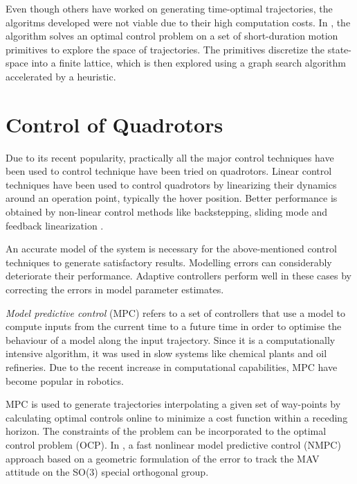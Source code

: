 Even though others have worked on generating time-optimal trajectories, the algoritms developed were not viable due to their high computation costs. In \cite{kumar2017search}, the algorithm solves an optimal control problem on a set of short-duration motion primitives to explore the space of trajectories. The primitives discretize the state-space into a finite lattice, which is then explored using a graph search algorithm accelerated by a heuristic. 

\section{Control of Quadrotors}
\label{sec:control_quadrotors}
Due to its recent popularity, practically all the major control techniques have been used to control technique have been tried on quadrotors. Linear control techniques \cite{seigwart2004pid} have been used to control quadrotors by linearizing their dynamics around an operation point, typically the hover position. Better performance is obtained by non-linear control methods like backstepping, sliding mode \cite{seigwart2005backstepping} and feedback linearization \cite{lewis2009dynamic}.

An accurate model of the system is necessary for the above-mentioned control techniques to generate satisfactory results. Modelling errors can considerably deteriorate their performance. Adaptive controllers \cite{kumar2011design} perform well in these cases by correcting the errors in model parameter estimates.

\textit{Model predictive control} (MPC) refers to a set of controllers that use a model to compute inputs from the current time to a future time in order to optimise the behaviour of a model along the input trajectory. Since it is a computationally intensive algorithm, it was used in slow systems like chemical plants and oil refineries. Due to the recent increase in computational capabilities, MPC have become popular in robotics. 

MPC is used to generate trajectories interpolating a given set of way-points \cite{singh2001trajectory} by calculating optimal controls online to minimize a cost function within a receding horizon. The constraints of the problem can be incorporated to the optimal control problem (OCP). In \cite{kamel2015fast}, a fast nonlinear model predictive control (NMPC) approach based on a geometric formulation of the error to track the MAV attitude on the SO(3) special orthogonal group. 

